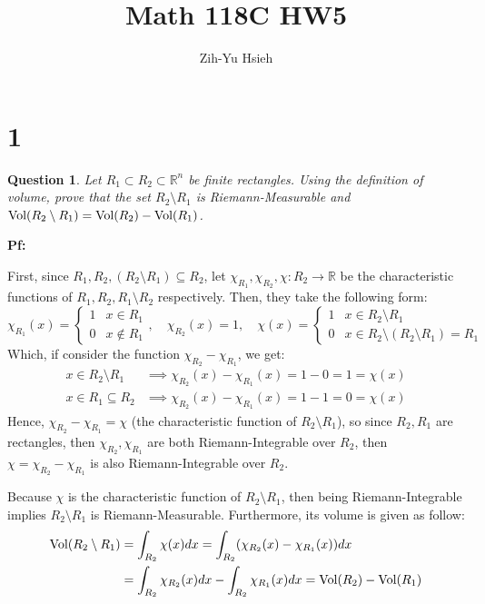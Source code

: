 \documentclass{article}
\title{Math 118C HW5}
\author{Zih-Yu Hsieh}
\newtheorem{question}{Question}
\begin{document}
\maketitle

\section*{1}
\begin{myBox}[]{}
    \begin{question}
        Let $R_1\subset R_2\subset\mathbb{R}^n$ be finite rectangles. Using the definition of volume, prove that the set $R_2\setminus R_1$ is Riemann-Measurable and $\textmd{Vol}(R_2\setminus R_1)=\textmd{Vol}(R_2)-\textmd{Vol}(R_1)$.
    \end{question}
\end{myBox}

\textbf{Pf:}

First, since $R_1,R_2,(R_2\setminus R_1) \subseteq R_2$, let $\chi_{R_1},\chi_{R_2}, \chi:R_2\rightarrow\mathbb{R}$ be the characteristic functions of $R_1,R_2,R_1\setminus R_2$ respectively. Then, they take the following form:
\begin{equation}
    \chi_{R_1}(x)=\begin{cases}
        1 & x\in R_1\\
        0 & x\notin R_1
    \end{cases},\quad \chi_{R_2}(x)=1,\quad \chi(x)=\begin{cases}
        1 & x\in R_2\setminus R_1\\
        0 & x \in R_2\setminus(R_2\setminus R_1) = R_1
    \end{cases}
\end{equation}
Which, if consider the function $\chi_{R_2}-\chi_{R_1}$, we get:
\begin{equation}
    \begin{split}
        x\in R_2\setminus R_1 &\implies \chi_{R_2}(x)-\chi_{R_1}(x) = 1-0 = 1 = \chi(x) \\
        x\in R_1\subseteq R_2 &\implies \chi_{R_2}(x)-\chi_{R_1}(x) = 1-1 = 0 = \chi(x)
    \end{split}
\end{equation}
Hence, $\chi_{R_2}-\chi_{R_1} = \chi$ (the characteristic function of $R_2\setminus R_1$), so since $R_2,R_1$ are rectangles, then $\chi_{R_2},\chi_{R_1}$ are both Riemann-Integrable over $R_2$, then $\chi = \chi_{R_2}-\chi_{R_1}$ is also Riemann-Integrable over $R_2$.

Because $\chi$ is the characteristic function of $R_2\setminus R_1$, then being Riemann-Integrable implies $R_2\setminus R_1$ is Riemann-Measurable. Furthermore, its volume is given as follow:
\begin{equation}
    \begin{split}
        \textmd{Vol}(R_2\setminus R_1) &= \int_{R_2}\chi(x)dx = \int_{R_2}(\chi_{R_2}(x)-\chi_{R_1}(x))dx \\
         &= \int_{R_2}\chi_{R_2}(x)dx - \int_{R_2}\chi_{R_1}(x)dx = \textmd{Vol}(R_2)-\textmd{Vol}(R_1)
    \end{split}
\end{equation}
\end{document}

